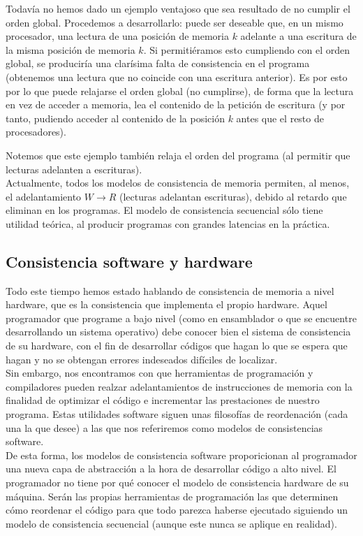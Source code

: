 Todavía no hemos dado un ejemplo ventajoso que sea resultado de no cumplir el orden global. Procedemos a desarrollarlo: puede ser deseable que, en un mismo procesador, una lectura de una posición de memoria $k$ adelante a una escritura de la misma posición de memoria $k$. Si permitiéramos esto cumpliendo con el orden global, se produciría una clarísima falta de consistencia en el programa (obtenemos una lectura que no coincide con una escritura anterior). Es por esto por lo que puede relajarse el orden global (no cumplirse), de forma que la lectura en vez de acceder a memoria, lea el contenido de la petición de escritura (y por tanto, pudiendo acceder al contenido de la posición $k$ antes que el resto de procesadores).

Notemos que este ejemplo también relaja el orden del programa (al permitir que lecturas adelanten a escrituras).\\

Actualmente, todos los modelos de consistencia de memoria permiten, al menos, el adelantamiento $W\rightarrow R$ (lecturas adelantan escrituras), debido al retardo que eliminan en los programas. El modelo de consistencia secuencial sólo tiene utilidad teórica, al producir programas con grandes latencias en la práctica.

\subsection{Consistencia software y hardware}
Todo este tiempo hemos estado hablando de consistencia de memoria a nivel hardware, que es la consistencia que implementa el propio hardware. Aquel programador que programe a bajo nivel (como en ensamblador o que se encuentre desarrollando un sistema operativo) debe conocer bien el sistema de consistencia de su hardware, con el fin de desarrollar códigos que hagan lo que se espera que hagan y no se obtengan errores indeseados difíciles de localizar.\\

Sin embargo, nos encontramos con que herramientas de programación y compiladores pueden realzar adelantamientos de instrucciones de memoria con la finalidad de optimizar el código e incrementar las prestaciones de nuestro programa. Estas utilidades software siguen unas filosofías de reordenación (cada una la que desee) a las que nos referiremos como modelos de consistencias software.\\

De esta forma, los modelos de consistencia software proporicionan al programador una nueva capa de abstracción a la hora de desarrollar código a alto nivel. El programador no tiene por qué conocer el modelo de consistencia hardware de su máquina. Serán las propias herramientas de programación las que determinen cómo reordenar el código para que todo parezca haberse ejecutado siguiendo un modelo de consistencia secuencial (aunque este nunca se aplique en realidad).

